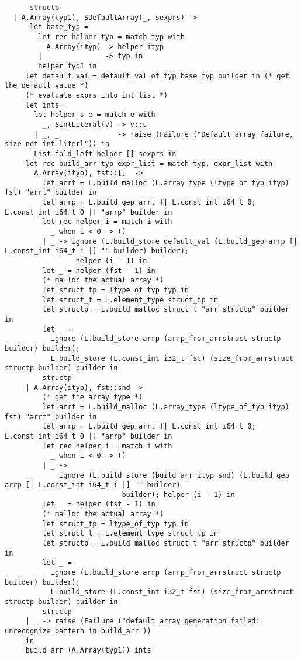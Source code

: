 \documentclass{article}
\begin{document}
\begin{verbatim}
      structp
  | A.Array(typ1), SDefaultArray(_, sexprs) ->
      let base_typ = 
        let rec helper typ = match typ with
          A.Array(ityp) -> helper ityp
        | _             -> typ in
        helper typ1 in
     let default_val = default_val_of_typ base_typ builder in (* get the default value *)
     (* evaluate exprs into int list *)
     let ints = 
       let helper s e = match e with
         _, SIntLiteral(v) -> v::s
       | _, _              -> raise (Failure ("Default array failure, size not int literl")) in
       List.fold_left helper [] sexprs in
     let rec build_arr typ expr_list = match typ, expr_list with
       A.Array(ityp), fst::[]  ->
         let arrt = L.build_malloc (L.array_type (ltype_of_typ ityp) fst) "arrt" builder in
         let arrp = L.build_gep arrt [| L.const_int i64_t 0; L.const_int i64_t 0 |] "arrp" builder in
         let rec helper i = match i with 
           _ when i < 0 -> ()
         | _ -> ignore (L.build_store default_val (L.build_gep arrp [| L.const_int i64_t i |] "" builder) builder); 
                 helper (i - 1) in
         let _ = helper (fst - 1) in
         (* malloc the actual array *)
         let struct_tp = ltype_of_typ typ in
         let struct_t = L.element_type struct_tp in
         let structp = L.build_malloc struct_t "arr_structp" builder in
         let _ = 
           ignore (L.build_store arrp (arrp_from_arrstruct structp builder) builder);
           L.build_store (L.const_int i32_t fst) (size_from_arrstruct structp builder) builder in
         structp
     | A.Array(ityp), fst::snd -> 
         (* get the array type *)
         let arrt = L.build_malloc (L.array_type (ltype_of_typ ityp) fst) "arrt" builder in
         let arrp = L.build_gep arrt [| L.const_int i64_t 0; L.const_int i64_t 0 |] "arrp" builder in
         let rec helper i = match i with 
           _ when i < 0 -> ()
         | _ -> 
             ignore (L.build_store (build_arr ityp snd) (L.build_gep arrp [| L.const_int i64_t i |] "" builder) 
                            builder); helper (i - 1) in
         let _ = helper (fst - 1) in
         (* malloc the actual array *)
         let struct_tp = ltype_of_typ typ in
         let struct_t = L.element_type struct_tp in
         let structp = L.build_malloc struct_t "arr_structp" builder in
         let _ = 
           ignore (L.build_store arrp (arrp_from_arrstruct structp builder) builder);
           L.build_store (L.const_int i32_t fst) (size_from_arrstruct structp builder) builder in
         structp 
     | _ -> raise (Failure ("default array generation failed: unrecognize pattern in build_arr"))
     in
     build_arr (A.Array(typ1)) ints


\end{verbatim}
\end{document}
